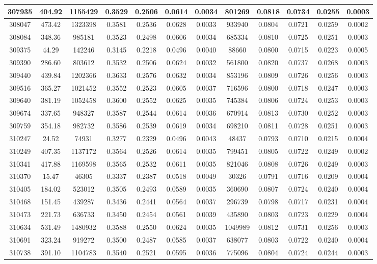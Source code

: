 \documentclass[10pt]{extarticle}
\begin{document}
\begin{longtable}{|c|c|c|c|c|c|c|c|c|c|c|c|}
\hline 
307935&404.92&1155429&0.3529&0.2506&0.0614&0.0034&801269&0.0818&0.0734&0.0255&0.0003 \\ 
\hline 
308047&473.42&1323398&0.3581&0.2536&0.0628&0.0033&933940&0.0804&0.0721&0.0259&0.0002 \\ 
\hline 
308084&348.36&985181&0.3523&0.2498&0.0606&0.0034&685334&0.0810&0.0725&0.0251&0.0003 \\ 
\hline 
309375&44.29&142246&0.3145&0.2218&0.0496&0.0040&88660&0.0800&0.0715&0.0223&0.0005 \\ 
\hline 
309390&286.60&803612&0.3532&0.2506&0.0624&0.0032&561800&0.0820&0.0737&0.0268&0.0003 \\ 
\hline 
309440&439.84&1202366&0.3633&0.2576&0.0632&0.0034&853196&0.0809&0.0726&0.0256&0.0003 \\ 
\hline 
309516&365.27&1021452&0.3552&0.2523&0.0605&0.0037&716596&0.0800&0.0718&0.0247&0.0003 \\ 
\hline 
309640&381.19&1052458&0.3600&0.2552&0.0625&0.0035&745384&0.0806&0.0724&0.0253&0.0003 \\ 
\hline 
309674&337.65&948327&0.3587&0.2544&0.0614&0.0036&670914&0.0813&0.0730&0.0252&0.0003 \\ 
\hline 
309759&354.18&982732&0.3586&0.2539&0.0619&0.0034&698210&0.0811&0.0728&0.0251&0.0003 \\ 
\hline 
310247&24.52&74931&0.3277&0.2329&0.0496&0.0043&48437&0.0793&0.0710&0.0215&0.0004 \\ 
\hline 
310249&407.35&1137172&0.3564&0.2526&0.0614&0.0035&799451&0.0805&0.0722&0.0249&0.0002 \\ 
\hline 
310341&417.88&1169598&0.3565&0.2532&0.0611&0.0035&821046&0.0808&0.0726&0.0249&0.0003 \\ 
\hline 
310370&15.47&46305&0.3337&0.2387&0.0518&0.0049&30326&0.0791&0.0716&0.0209&0.0004 \\ 
\hline 
310405&184.02&523012&0.3505&0.2493&0.0589&0.0035&360690&0.0807&0.0724&0.0240&0.0004 \\ 
\hline 
310468&151.45&439287&0.3436&0.2441&0.0564&0.0037&296739&0.0798&0.0717&0.0231&0.0004 \\ 
\hline 
310473&221.73&636733&0.3450&0.2454&0.0561&0.0039&435890&0.0803&0.0723&0.0229&0.0004 \\ 
\hline 
310634&531.49&1480932&0.3588&0.2550&0.0624&0.0035&1049989&0.0812&0.0731&0.0256&0.0003 \\ 
\hline 
310691&323.24&919272&0.3500&0.2487&0.0585&0.0037&638077&0.0803&0.0722&0.0240&0.0004 \\ 
\hline 
310738&391.10&1104783&0.3540&0.2521&0.0595&0.0036&775096&0.0804&0.0724&0.0244&0.0003 \\ 

\end{longtable}
\end{document}

